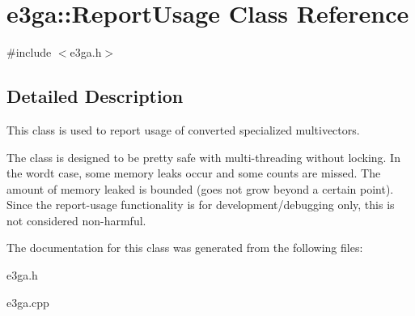 \hypertarget{classe3ga_1_1_report_usage}{\section{e3ga\-:\-:Report\-Usage Class Reference}
\label{classe3ga_1_1_report_usage}
}


{\ttfamily \#include $<$e3ga.\-h$>$}



\subsection{Detailed Description}
This class is used to report usage of converted specialized multivectors.

The class is designed to be pretty safe with multi-\/threading without locking. In the wordt case, some memory leaks occur and some counts are missed. The amount of memory leaked is bounded (goes not grow beyond a certain point). Since the report-\/usage functionality is for development/debugging only, this is not considered non-\/harmful. 

The documentation for this class was generated from the following files\-:\begin{DoxyCompactItemize}
\item 
e3ga.\-h\item 
e3ga.\-cpp\end{DoxyCompactItemize}
